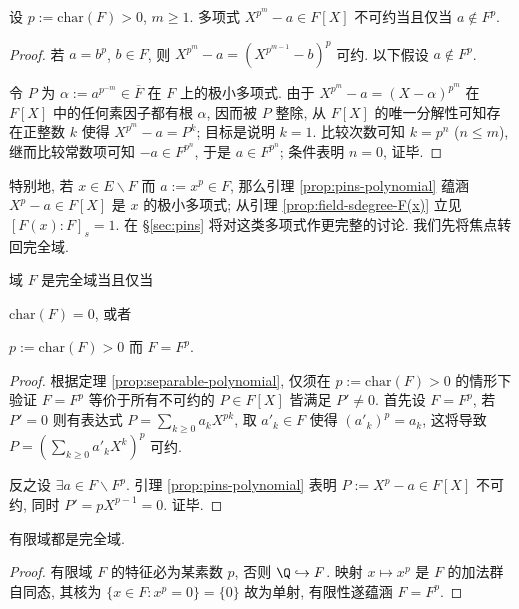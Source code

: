 \begin{lemma}\label{prop:pins-polynomial}
	设 $p := \text{char}(F) > 0$, $m \geq 1$. 多项式 $X^{p^m} - a \in F[X]$ 不可约当且仅当 $a \notin F^p$.
\end{lemma}
\begin{proof}
	若 $a = b^p$, $b \in F$, 则 $X^{p^m}-a = \left( X^{p^{m-1}}-b \right)^p$ 可约. 以下假设 $a \notin F^p$.

	令 $P$ 为 $\alpha := a^{p^{-m}} \in \overline{F}$ 在 $F$ 上的极小多项式. 由于 $X^{p^m}-a =(X-\alpha)^{p^m}$ 在 $F[X]$ 中的任何素因子都有根 $\alpha$, 因而被 $P$ 整除, 从 $F[X]$ 的唯一分解性可知存在正整数 $k$ 使得 $X^{p^m}-a = P^k$; 目标是说明 $k=1$. 比较次数可知 $k = p^n$ ($n \leq m$), 继而比较常数项可知 $-a \in F^{p^n}$, 于是 $a \in F^{p^n}$; 条件表明 $n=0$, 证毕.
\end{proof}
特别地, 若 $x \in E \smallsetminus F$ 而 $a := x^p \in F$, 那么引理 \ref{prop:pins-polynomial} 蕴涵 $X^p - a \in F[X]$ 是 $x$ 的极小多项式; 从引理 \ref{prop:field-sdegree-F(x)} 立见 $[F(x):F]_s = 1$. 在 \S\ref{sec:pins} 将对这类多项式作更完整的讨论. 我们先将焦点转回完全域.

\begin{theorem}\label{prop:perfect-field-char}
	域 $F$ 是完全域当且仅当
	\begin{inparaenum}[(a)]
		\item $\text{char}(F)=0$, 或者
		\item $p := \text{char}(F) > 0$ 而 $F = F^p$.
	\end{inparaenum}
\end{theorem}
\begin{proof}
	根据定理 \ref{prop:separable-polynomial}, 仅须在 $p := \text{char}(F) > 0$ 的情形下验证 $F=F^p$ 等价于所有不可约的 $P \in F[X]$ 皆满足 $P' \neq 0$. 首先设 $F=F^p$, 若 $P' = 0$ 则有表达式 $P = \sum_{k \geq 0} a_k X^{pk}$, 取 $a'_k \in F$ 使得 $(a'_k)^p = a_k$, 这将导致 $P = (\sum_{k \geq 0} a'_k X^k)^p$ 可约.
	
	反之设 $\exists a \in F \smallsetminus F^p$. 引理 \ref{prop:pins-polynomial} 表明 $P := X^p - a \in F[X]$ 不可约, 同时 $P' = pX^{p-1} = 0$. 证毕.
\end{proof}

\begin{corollary}
	有限域都是完全域.
\end{corollary}
\begin{proof}
	有限域 $F$ 的特征必为某素数 $p$, 否则 $\Q \hookrightarrow F$. 映射 $x \mapsto x^p$ 是 $F$ 的加法群自同态, 其核为 $\{x \in F: x^p=0 \} = \{0\}$ 故为单射, 有限性遂蕴涵 $F=F^p$.
\end{proof}

